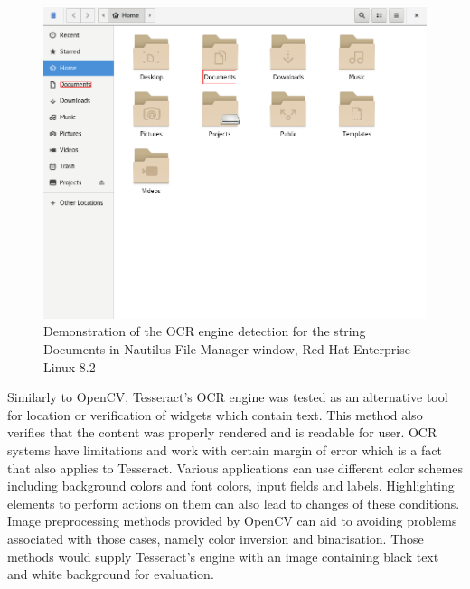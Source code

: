 \begin{figure}[hbt]
	\centering
	\includegraphics[width=1\textwidth]{obrazky-figures/ocr+nautilus.png}
	\caption{Demonstration of the OCR engine detection for the string Documents in Nautilus File Manager window, Red Hat Enterprise Linux 8.2}
	\label{ocr_nautilus}
\end{figure}

Similarly to OpenCV, Tesseract's OCR engine was tested as an alternative tool for location or verification of widgets which contain text. This method also verifies that the content was properly rendered and is readable for user. OCR systems have limitations and work with certain margin of error which is a fact that also applies to Tesseract. Various applications can use different color schemes including background colors and font colors, input fields and labels. Highlighting elements to perform actions on them can also lead to changes of these conditions. Image preprocessing methods provided by OpenCV can aid to avoiding problems associated with those cases, namely color inversion and binarisation. Those methods would supply Tesseract's engine with an image containing black text and white background for evaluation.

